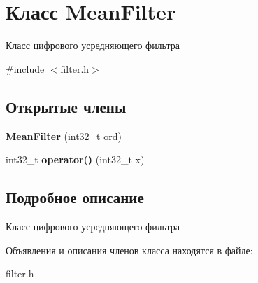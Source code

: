 \hypertarget{classMeanFilter}{}\section{Класс Mean\+Filter}
\label{classMeanFilter}


Класс цифрового усредняющего фильтра  




{\ttfamily \#include $<$filter.\+h$>$}

\subsection*{Открытые члены}
\begin{DoxyCompactItemize}
\item 
\mbox{\label{classMeanFilter_ae3c9f665fde03a41a994ca509d9862af}} 
{\bfseries Mean\+Filter} (int32\+\_\+t ord)
\item 
\mbox{\label{classMeanFilter_a5f6eabe16c6bbf4266a7d2a9b188b0c5}} 
int32\+\_\+t {\bfseries operator()} (int32\+\_\+t x)
\end{DoxyCompactItemize}


\subsection{Подробное описание}
Класс цифрового усредняющего фильтра 

Объявления и описания членов класса находятся в файле\+:\begin{DoxyCompactItemize}
\item 
filter.\+h\end{DoxyCompactItemize}
